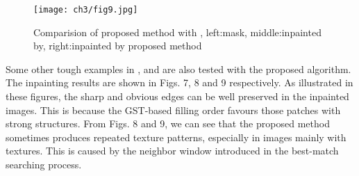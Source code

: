 \begin{figure}[!htbp]
\begin{center}
  \texttt{[image: ch3/fig9.jpg]}
\end{center}
\caption{Comparision of proposed method with \cite{LeMeur:2012}, left:mask, middle:inpainted by\cite{LeMeur:2012}, right:inpainted by proposed method}
\label{fig:9}       %
\end{figure}\par
Some other tough examples in \cite{LeMeur_2011}, \cite{kwokFast} and \cite{LeMeur:2012} are also tested with the proposed algorithm. The inpainting results are shown in Figs. 7, 8 and 9 respectively. As illustrated in these figures, the sharp and obvious edges can be well preserved in the inpainted images. This is because the GST-based filling order favours those patches with strong structures. From Figs. 8 and 9, we can see that the proposed method sometimes produces repeated texture patterns, especially in images mainly with textures. This is caused by the neighbor window introduced in the best-match searching process.

